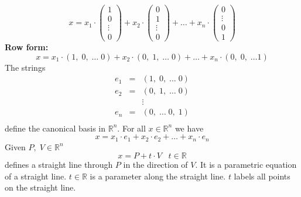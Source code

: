 \documentclass[color=black,11pt]{elegantpaper}
\begin{document}
$$
x=x_1 \cdot \left(\begin{array}{c}
                 1\\
                 0\\ 
                 \vdots\\
                 0 
            \end{array}\right) + x_2 \cdot \left(\begin{array}{c}
                                         0\\
                                         1\\
                                       \vdots\\
                                         0
                                       \end{array}\right) + \dots + x_n \cdot \left(\begin{array}{c}
                                                                            0\\
                                                                         \vdots\\
                0\\ 
                                                                            1     
                                                                                  \end{array}\right)
$$
{\bf Row form:}\\
$$
x= x_1\cdot (1,\;0,\; \dots \; 0) + x_2 \cdot (0,\; 1,\; \dots \; 0) + \dots + x_n \cdot (0,\;0,\; \dots 1)
$$
The strings
\begin{eqnarray*}
e_1&=&(1,\;0,\; \dots\; 0)\\
e_2&=&(0,\;1,\; \dots\; 0)\\
&& \vdots\\
e_n&=&(0,\; \dots\; 0,\;1)\\
\end{eqnarray*}
define the canonical basis in $\mathbb{R}^n.$ For all $x\in \mathbb{R}^n$ we have
$$
x= x_1 \cdot e_1 + x_2 \cdot e_2 + \dots + x_n \cdot e_n
$$
Given $P,\;V\in \mathbb{R}^n$
\begin{equation}
\label{eq:ndline}
x= P+ t \cdot V\;\;\;t\in \mathbb{R}
\end{equation}
defines a straight line through $P$ in the direction of $V.$ It is a parametric equation of a straight line. $t\in \mathbb{R}$ is a parameter along the straight line. $t$ labels all points on the straight line.
\end{document}
